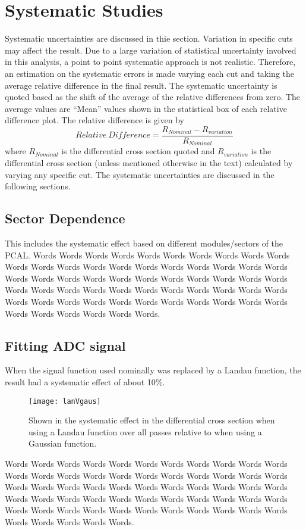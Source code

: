 \section{Systematic Studies}
Systematic uncertainties are discussed in thie section. 
Variation in specific cuts may affect the result. Due to a
large variation of statistical uncertainty involved in this analysis, 
a point to point systematic approach is not realistic. Therefore, 
an estimation on the systematic errors is made varying each cut 
and taking the average relative difference in the final result. 
The systematic uncertainty is quoted based as the shift of the 
average of the relative differences from zero. The average values
are ``Mean'' values shown in the statistical box of each relative difference plot.
The relative difference is given by
\begin{equation}
 Relative~Difference = \frac{R_{Nominal} - R_{variation}}{R_{Nominal}}
\end{equation}
where $R_{Nominal}$ is the differential cross section quoted and $R_{variation}$ 
is the differential cross section (unless mentioned otherwise in the text) 
calculated by varying any specific cut. The systematic uncertainties 
are discussed in the following sections.

\subsection{Sector Dependence}
\label{Sec:SysSecDep}
This includes the systematic effect based on different modules/sectors of the PCAL.
Words Words Words Words Words Words Words Words Words Words Words Words Words Words Words
Words Words Words Words Words Words Words Words Words Words Words Words Words Words Words 
Words Words Words Words Words Words Words Words Words Words Words Words Words Words Words 
Words Words Words Words Words Words Words Words Words Words Words Words Words Words Words.

\subsection{Fitting ADC signal}
\label{Sec:SysFitAdcSig}
When the signal function used nominally was replaced by a Landau function, 
the result had a systematic effect of about 10\%.

\begin{figure}[h]
    \centering
    \texttt{[image: lanVgaus]}
    \caption{Shown in the systematic effect in the differential cross section when
    using a Landau function over all passes relative to when using a Gaussian function.}
    \label{fig:lanVgaus}
\end{figure}

Words Words Words Words Words Words Words Words Words Words Words Words Words Words Words
Words Words Words Words Words Words Words Words Words Words Words Words Words Words Words 
Words Words Words Words Words Words Words Words Words Words Words Words Words Words Words 
Words Words Words Words Words Words Words Words Words Words Words Words Words Words Words.